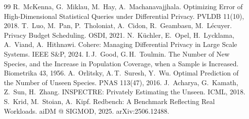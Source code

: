 \documentclass[runningheads]{llncs}
\begin{document}
\begin{thebibliography}{99}
 R.\ McKenna, G.\ Miklau, M.\ Hay, A.\ Machanavajjhala. Optimizing Error of High-Dimensional Statistical Queries under Differential Privacy. PVLDB 11(10), 2018.
 T.\ Luo, M.\ Pan, P.\ Tholoniat, A.\ Cidon, R.\ Geambasu, M.\ L\'ecuyer. Privacy Budget Scheduling. OSDI, 2021.
 N.\ K\"uchler, E.\ Opel, H.\ Lycklama, A.\ Viand, A.\ Hithnawi. Cohere: Managing Differential Privacy in Large Scale Systems. IEEE S\&P, 2024.
 I.\,J.\ Good, G.\,H.\ Toulmin. The Number of New Species, and the Increase in Population Coverage, when a Sample is Increased. Biometrika 43, 1956.
 A.\ Orlitsky, A.\,T.\ Suresh, Y.\ Wu. Optimal Prediction of the Number of Unseen Species. PNAS 113(47), 2016.
 J.\ Acharya, G.\ Kamath, Z.\ Sun, H.\ Zhang. INSPECTRE: Privately Estimating the Unseen. ICML, 2018.
 S.\ Krid, M.\ Stoian, A.\ Kipf. Redbench: A Benchmark Reflecting Real Workloads. aiDM @ SIGMOD, 2025. arXiv:2506.12488.
\end{thebibliography}
\end{document}
